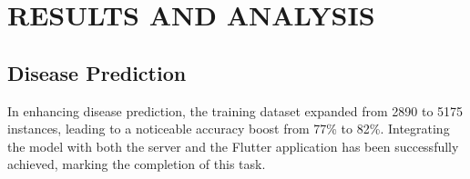 \section{RESULTS AND ANALYSIS}
\subsection{Disease Prediction}
In enhancing disease prediction, the training dataset expanded from 2890 to 5175 instances, leading to a noticeable accuracy boost from 77\% to 82\%. Integrating the model with both the server and the Flutter application has been successfully achieved, marking the completion of this task.
\vspace{1cm}
\begin{figure}[ht]
  \centering
  \begin{subfigure}{0.43\textwidth}

\end{subfigure}
\end{figure}
